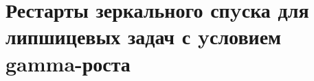 \chapter{Рестарты зеркального спyска для липшицевых задач с yсловием gamma-роста}\label{ch:ch3}

\FloatBarrier